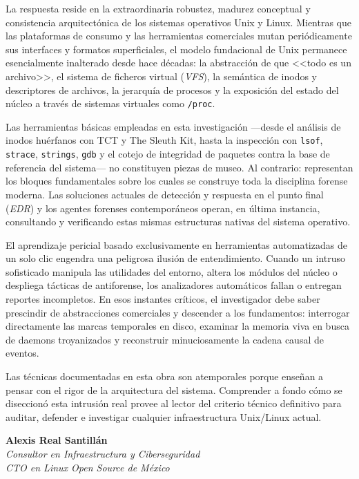 La respuesta reside en la extraordinaria robustez, madurez conceptual y consistencia arquitectónica de los sistemas operativos Unix y Linux. Mientras que las plataformas de consumo y las herramientas comerciales mutan periódicamente sus interfaces y formatos superficiales, el modelo fundacional de Unix permanece esencialmente inalterado desde hace décadas: la abstracción de que <<todo es un archivo>>, el sistema de ficheros virtual (\textit{VFS}), la semántica de inodos y descriptores de archivos, la jerarquía de procesos y la exposición del estado del núcleo a través de sistemas virtuales como \texttt{/proc}.

Las herramientas básicas empleadas en esta investigación ---desde el análisis de inodos huérfanos con TCT y The Sleuth Kit, hasta la inspección con \texttt{lsof}, \texttt{strace}, \texttt{strings}, \texttt{gdb} y el cotejo de integridad de paquetes contra la base de referencia del sistema--- no constituyen piezas de museo. Al contrario: representan los bloques fundamentales sobre los cuales se construye toda la disciplina forense moderna. Las soluciones actuales de detección y respuesta en el punto final (\textit{EDR}) y los agentes forenses contemporáneos operan, en última instancia, consultando y verificando estas mismas estructuras nativas del sistema operativo.

El aprendizaje pericial basado exclusivamente en herramientas automatizadas de un solo clic engendra una peligrosa ilusión de entendimiento. Cuando un intruso sofisticado manipula las utilidades del entorno, altera los módulos del núcleo o despliega tácticas de antiforense, los analizadores automáticos fallan o entregan reportes incompletos. En esos instantes críticos, el investigador debe saber prescindir de abstracciones comerciales y descender a los fundamentos: interrogar directamente las marcas temporales en disco, examinar la memoria viva en busca de daemons troyanizados y reconstruir minuciosamente la cadena causal de eventos.

Las técnicas documentadas en esta obra son atemporales porque enseñan a pensar con el rigor de la arquitectura del sistema. Comprender a fondo cómo se diseccionó esta intrusión real provee al lector del criterio técnico definitivo para auditar, defender e investigar cualquier infraestructura Unix/Linux actual.

\vspace{1.5em}
\noindent\begin{minipage}{\linewidth}
\raggedleft
\textbf{Alexis Real Santillán}\\[3pt]
\textit{Consultor en Infraestructura y Ciberseguridad}\\[2pt]
\textit{CTO en Linux Open Source de México}
\end{minipage}
